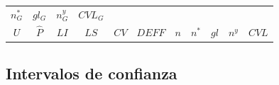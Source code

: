 \documentclass[12pt,spanish,]{book}
\begin{document}
\begin{longtable}[]{@{}ccccccccccc@{}}
\begin{minipage}[t]{0.11\columnwidth}
\(n^*_G\)\strut
\end{minipage} & \begin{minipage}[t]{0.05\columnwidth}\centering
\(gl_G\)\strut
\end{minipage} & \begin{minipage}[t]{0.04\columnwidth}\centering
\(n^y_G\)\strut
\end{minipage} & \begin{minipage}[t]{0.11\columnwidth}\centering
\(CVL_G\)\strut
\end{minipage}\tabularnewline
\begin{minipage}[t]{0.09\columnwidth}\centering
\(U\)\strut
\end{minipage} & \begin{minipage}[t]{0.07\columnwidth}\centering
\(\hat{P}\)\strut
\end{minipage} & \begin{minipage}[t]{0.04\columnwidth}\centering
\(LI\)\strut
\end{minipage} & \begin{minipage}[t]{0.04\columnwidth}\centering
\(LS\)\strut
\end{minipage} & \begin{minipage}[t]{0.07\columnwidth}\centering
\(CV\)\strut
\end{minipage} & \begin{minipage}[t]{0.05\columnwidth}\centering
\(DEFF\)\strut
\end{minipage} & \begin{minipage}[t]{0.05\columnwidth}\centering
\(n\)\strut
\end{minipage} & \begin{minipage}[t]{0.11\columnwidth}\centering
\(n^*\)\strut
\end{minipage} & \begin{minipage}[t]{0.05\columnwidth}\centering
\(gl\)\strut
\end{minipage} & \begin{minipage}[t]{0.04\columnwidth}\centering
\(n^y\)\strut
\end{minipage} & \begin{minipage}[t]{0.11\columnwidth}\centering
\(CVL\)\strut
\end{minipage}\tabularnewline
\bottomrule
\end{longtable}

\normalsize

\hypertarget{intervalos-de-confianza}{%
\subsection{Intervalos de confianza}\label{intervalos-de-confianza}}
\end{document}
